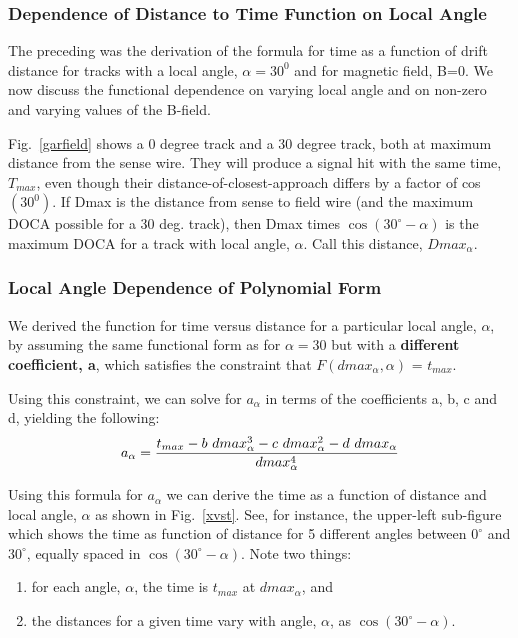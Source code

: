 \subsubsection{Dependence of Distance to Time Function on Local Angle}
\noindent
The preceding was the derivation of the formula for time as a function
of drift distance for tracks with a local angle, $\alpha = 30^0$ and for magnetic field, B=0.
We now discuss the
functional dependence on varying local angle and on non-zero and varying
values of the B-field.

Fig.~\ref{garfield} shows a 0 degree track and a 30 degree
track, both at maximum distance from the sense wire.  They will produce
a signal hit with the same time, $T_{max}$, even though their distance-of-closest-approach 
differs by a factor
of cos$(30^{0})$.  If Dmax is the distance from sense to field wire (and the maximum
DOCA possible for a 30 deg. track), then Dmax times $\cos(30^\circ-\alpha)$ is the maximum
DOCA for a track with local angle, $\alpha$.  Call this distance, $Dmax_{\alpha}$.

\subsubsection{Local Angle Dependence of Polynomial Form}
We derived the function for time versus distance for a particular local angle, $\alpha$, by
assuming the same functional form as for $\alpha = 30$ but with a {\bf different coefficient, a}, which 
satisfies the constraint that  $F(dmax_{\alpha},\alpha)$ = $t_{max}$.

Using this constraint, we can solve for $a_{\alpha}$ in terms of the coefficients a, b, c and d,
yielding the following:
\begin{equation}
\label{aalphaequation}
a_{\alpha} = {{t_{max} - b ~dmax_{\alpha}^3 - c ~dmax_{\alpha}^2 - d ~dmax_{\alpha}}\over{dmax_{\alpha}^4}}
\end{equation}

Using this formula for $a_{\alpha}$ we can derive the time as a function of distance and local
angle, $\alpha$ as shown in Fig.~\ref{xvst}.  See, for instance, the upper-left sub-figure 
which shows the time as function of distance for 5 different angles between $0^{\circ}$ and 
$30^{\circ}$, equally spaced in $\cos \left(30^\circ-\alpha\right)$.  Note two things:
\begin{enumerate}
\item for each angle, $\alpha$, the time is $t_{max}$ at $dmax_{\alpha}$, and
\item the distances for a given time vary with angle, $\alpha$, as $\cos \left(30^\circ-\alpha\right)$.
\end{enumerate}


